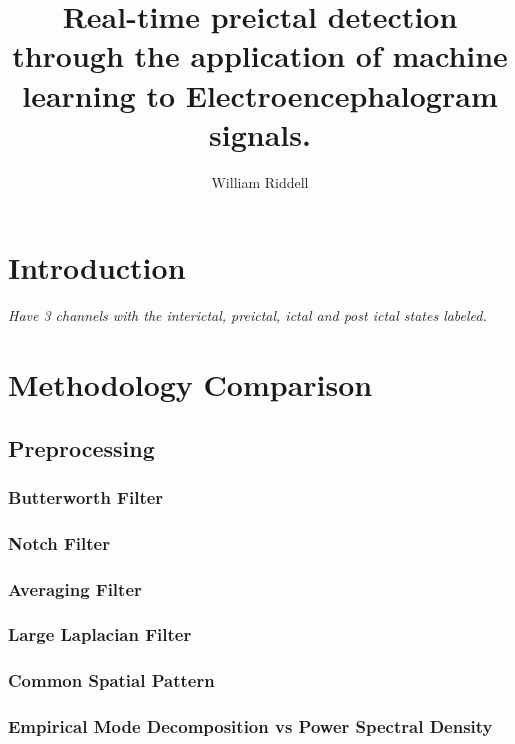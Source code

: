 \documentclass[12pt]{article}
\title{Real-time preictal detection through the application of machine learning to Electroencephalogram signals.}
\author{William Riddell}
\begin{document}
\maketitle
\pagebreak
\tableofcontents
\pagebreak

\section{Introduction}

\textit{Have 3 channels with the interictal, preictal, ictal and post ictal states labeled.}



\section{Methodology Comparison}




\subsection{Preprocessing}

\subsubsection{Butterworth Filter}

\subsubsection{Notch Filter}

\subsubsection{Averaging Filter}

\subsubsection{Large Laplacian Filter}

\subsubsection{Common Spatial Pattern}

\subsubsection{Empirical Mode Decomposition vs Power Spectral Density}
\end{document}
